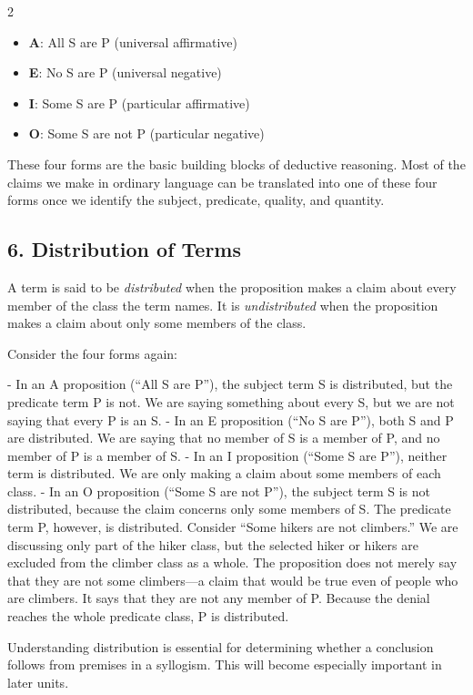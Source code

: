 \documentclass[12pt]{article}
\begin{document}
\begin{multicols}{2}
\begin{itemize}
\item \textbf{A}: All S are P (universal affirmative)
\item \textbf{E}: No S are P (universal negative)
\item \textbf{I}: Some S are P (particular affirmative)
\item \textbf{O}: Some S are not P (particular negative)
\end{itemize}

These four forms are the basic building blocks of deductive reasoning. Most of the claims we make in ordinary language can be translated into one of these four forms once we identify the subject, predicate, quality, and quantity.

\subsection*{6. Distribution of Terms}
A term is said to be \textit{distributed} when the proposition makes a claim about every member of the class the term names. It is \textit{undistributed} when the proposition makes a claim about only some members of the class.

Consider the four forms again:

- In an A proposition (“All S are P”), the subject term S is distributed, but the predicate term P is not. We are saying something about every S, but we are not saying that every P is an S.
- In an E proposition (“No S are P”), both S and P are distributed. We are saying that no member of S is a member of P, and no member of P is a member of S.
- In an I proposition (“Some S are P”), neither term is distributed. We are only making a claim about some members of each class.
- In an O proposition (“Some S are not P”), the subject term S is not distributed, because the claim concerns only some members of S. The predicate term P, however, is distributed. Consider “Some hikers are not climbers.” We are discussing only part of the hiker class, but the selected hiker or hikers are excluded from the climber class as a whole. The proposition does not merely say that they are not some climbers---a claim that would be true even of people who are climbers. It says that they are not any member of P. Because the denial reaches the whole predicate class, P is distributed.

Understanding distribution is essential for determining whether a conclusion follows from premises in a syllogism. This will become especially important in later units.


\end{multicols}
\end{document}
